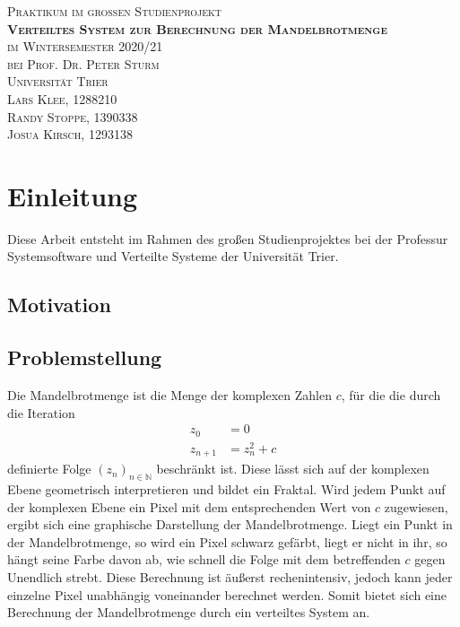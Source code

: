 \documentclass[12pt, onecolumn, notitlepage]{scrartcl}
\begin{document}
\renewcommand{\figurename}{Abb.} 


\thispagestyle{empty}
\vspace*{7cm}
\begin{center}
	\Large{
		\textsc{
			Praktikum im großen Studienprojekt \\ [1em]
			\textbf{Verteiltes System zur Berechnung der Mandelbrotmenge} \\ [1em]
			im Wintersemester 2020/21 \\
			bei Prof. Dr. Peter Sturm \\ [1em]
			Universität Trier \\ [1em]
			Lars Klee, 1288210 \\
			Randy Stoppe, 1390338 \\
			Josua Kirsch, 1293138
		}
	}
\end{center}
\setcounter{page}{0}
\newpage

\newpage
	\tableofcontents
\newpage
{}


\section{Einleitung}
Diese Arbeit entsteht im Rahmen des großen Studienprojektes bei der Professur Systemsoftware und Verteilte Systeme der Universität Trier.
\subsection{Motivation}
\subsection{Problemstellung}
Die Mandelbrotmenge ist die Menge der komplexen Zahlen $c$, für die die durch die Iteration \begin{align*}
z_{ 0 } &= 0  \\
z_{ n+1 } &= z_{ n }^{ 2 } + c
\end{align*}
definierte Folge $(z_{ n })_{ n\in \mathbb{N} }$ beschränkt ist. Diese lässt sich auf der komplexen Ebene geometrisch interpretieren und bildet ein Fraktal. Wird jedem Punkt auf der komplexen Ebene ein Pixel mit dem entsprechenden Wert von $c$ zugewiesen, ergibt sich eine graphische Darstellung der Mandelbrotmenge. Liegt ein Punkt in der Mandelbrotmenge, so wird ein Pixel schwarz gefärbt, liegt er nicht in ihr, so hängt seine Farbe davon ab, wie schnell die Folge mit dem betreffenden $c$ gegen Unendlich strebt. Diese Berechnung ist äußerst rechenintensiv, jedoch kann jeder einzelne Pixel unabhängig voneinander berechnet werden. Somit bietet sich eine Berechnung der Mandelbrotmenge durch ein verteiltes System an.
\end{document}
